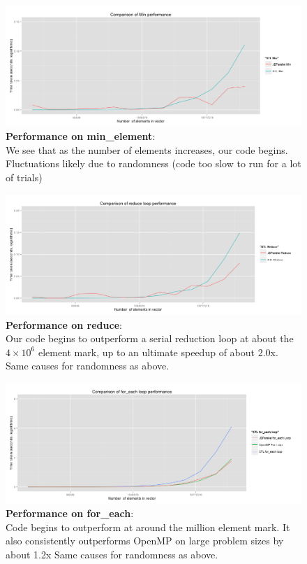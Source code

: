 \documentclass{article}
\begin{document}
 \begin{figure}[t!]
    \centering
\includegraphics[scale = 0.4]{Min_comparison}
    \caption{\textbf{Performance on min\_element}:\\We see that as the number of elements increases, our code begins. Fluctuations likely due to randomness (code too slow to run for a lot of trials)}
    \end{figure}
 \begin{figure}[h!]
    \centering
\includegraphics[scale = 0.4]{Reduce_comparison}
    \caption{\textbf{Performance on reduce}:\\ Our code begins to outperform a serial reduction loop at about the $4 \times 10^6$ element mark, up to an ultimate speedup of about 2.0x.  Same causes for randomness as above.}
    \end{figure}
     \begin{figure}[h!]
    \centering
\includegraphics[scale = 0.4]{for_each_loop_comparison}
    \caption{\textbf{Performance on for\_each}:\\ Code begins to outperform at around the million element mark. It also consistently outperforms OpenMP on large problem sizes by about 1.2x Same causes for randomness  as above.}
    \end{figure}
\end{document}
